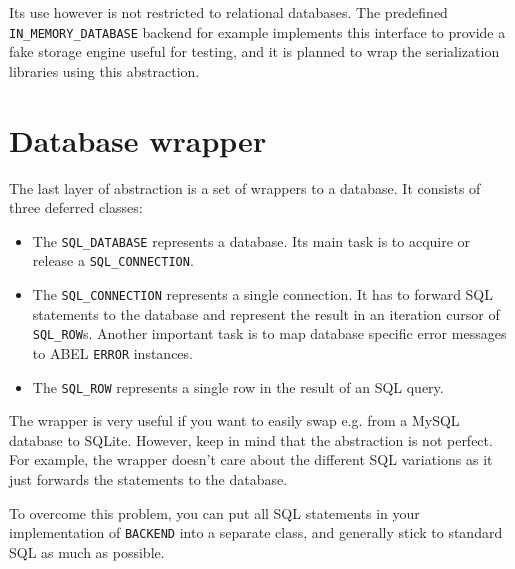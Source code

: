 \documentclass[a4paper,12pt]{report}
\begin{document}
Its use however is not restricted to relational databases.
The predefined \lstinline!IN_MEMORY_DATABASE! backend for example implements this interface to provide a fake storage engine useful for testing, and it is planned to wrap the serialization libraries using this abstraction.

\section{Database wrapper}


The last layer of abstraction is a set of wrappers to a database. 
It consists of three deferred classes: 
\begin{itemize}
 \item The \lstinline!SQL_DATABASE! represents a database. Its main task is to acquire or release a \lstinline!SQL_CONNECTION!.
 \item The \lstinline!SQL_CONNECTION! represents a single connection. 
It has to forward SQL statements to the database and represent the result in an iteration cursor of \lstinline!SQL_ROW!s.
Another important task is to map database specific error messages to ABEL \lstinline!ERROR! instances.
  \item The \lstinline!SQL_ROW! represents a single row in the result of an SQL query.
\end{itemize}

The wrapper is very useful if you want to easily swap e.g. from a MySQL database to SQLite.
However, keep in mind that the abstraction is not perfect. 
For example, the wrapper doesn't care about the different SQL variations as it just forwards the statements to the database.

To overcome this problem, you can put all SQL statements in your implementation of \lstinline!BACKEND! into a separate class, and generally stick to standard SQL as much as possible.
\end{document}
